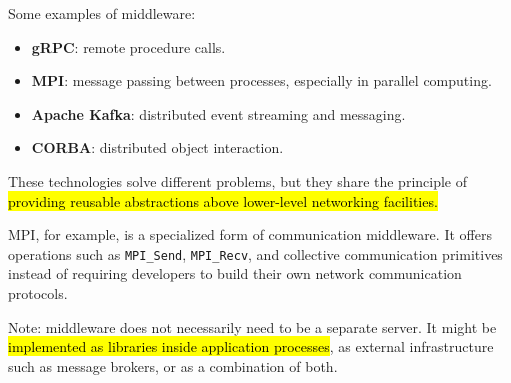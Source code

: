 \newpage

\begin{examplebox}
    Some examples of middleware:
    \begin{itemize}
        \item \textbf{gRPC}: remote procedure calls.
        \item \textbf{MPI}: message passing between processes, especially in parallel computing.
        \item \textbf{Apache Kafka}: distributed event streaming and messaging.
        \item \textbf{CORBA}: distributed object interaction.
    \end{itemize}
    These technologies solve different problems, but they share the principle of \hl{providing reusable abstractions above lower-level networking facilities.}

    \highspace
    MPI, for example, is a specialized form of communication middleware. It offers operations such as \texttt{MPI\_Send}, \texttt{MPI\_Recv}, and collective communication primitives instead of requiring developers to build their own network communication protocols.

    \highspace
    Note: middleware does not necessarily need to be a separate server. It might be \hl{implemented as libraries inside application processes}, as external infrastructure such as message brokers, or as a combination of both.
\end{examplebox}

